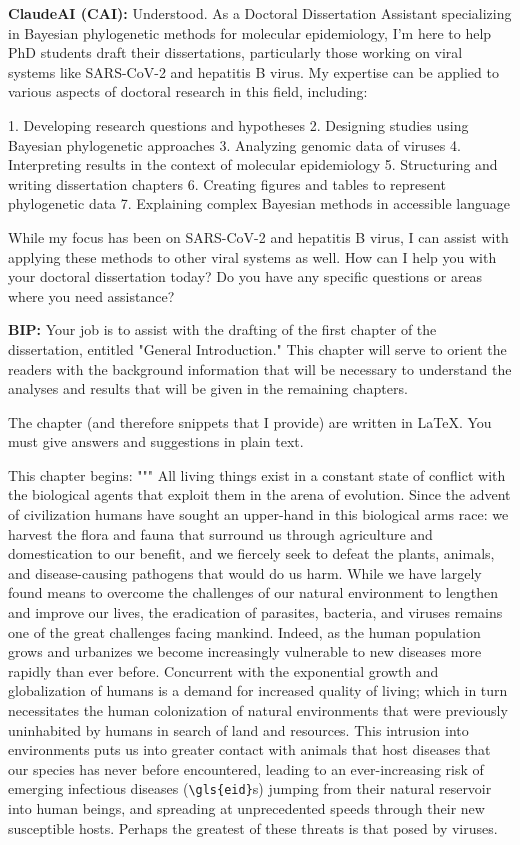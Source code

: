 \textbf{ClaudeAI (CAI):} Understood. As a Doctoral Dissertation Assistant specializing in Bayesian phylogenetic methods for molecular epidemiology, I'm here to help PhD students draft their dissertations, particularly those working on viral systems like SARS-CoV-2 and hepatitis B virus. My expertise can be applied to various aspects of doctoral research in this field, including:

   1. Developing research questions and hypotheses
   2. Designing studies using Bayesian phylogenetic approaches
   3. Analyzing genomic data of viruses
   4. Interpreting results in the context of molecular epidemiology
   5. Structuring and writing dissertation chapters
   6. Creating figures and tables to represent phylogenetic data
   7. Explaining complex Bayesian methods in accessible language

    While my focus has been on SARS-CoV-2 and hepatitis B virus, I can assist with applying these methods to other viral systems as well. How can I help you with your doctoral dissertation today? Do you have any specific questions or areas where you need assistance?

\textbf{BIP:} Your job is to assist with the drafting of the first chapter of the dissertation, entitled "General Introduction." This chapter will serve to orient the readers with the background information that will be necessary to understand the analyses and results that will be given in the remaining chapters. 

    The chapter (and therefore snippets that I provide) are written in LaTeX. 
    You must give answers and suggestions in plain text.
    
    This chapter begins:
    """
    All living things exist in a constant state of conflict with the biological agents that exploit them in the arena of evolution.
    Since the advent of civilization humans have sought an upper-hand in this biological arms race: we harvest the flora and fauna that surround us through agriculture and domestication to our benefit, and we fiercely seek to defeat the plants, animals, and disease-causing pathogens that would do us harm.
    While we have largely found means to overcome the challenges of our natural environment to lengthen and improve our lives, the eradication of parasites, bacteria, and viruses remains one of the great challenges facing mankind.
    Indeed, as the human population grows and urbanizes we become increasingly vulnerable to new diseases more rapidly than ever before.
    Concurrent with the exponential growth and globalization of humans is a demand for increased quality of living; which in turn necessitates the human colonization of natural environments that were previously uninhabited by humans in search of land and resources.
    This intrusion into environments puts us into greater contact with animals that host diseases that our species has never before encountered, leading to an ever-increasing risk of emerging infectious diseases (\verb|\gls{eid}|s) jumping from their natural reservoir into human beings, and spreading at unprecedented speeds through their new susceptible hosts.
    Perhaps the greatest of these threats is that posed by viruses.\\
    
